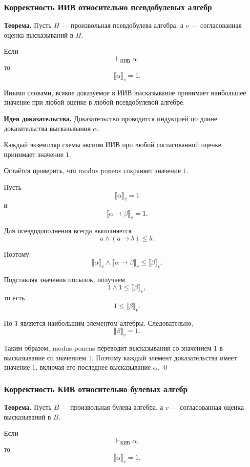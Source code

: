 \documentclass[12pt,a4paper,oneside,openany]{book}
\theoremstyle{definition}
\theoremstyle{plain}
\theoremstyle{remark}
\begin{document}
\subsubsection{Корректность ИИВ относительно псевдобулевых алгебр}

\textbf{Теорема.}
Пусть \(H\) --- произвольная псевдобулева алгебра, а \(v\) ---
согласованная оценка высказываний в \(H\).

Если
\[
\vdash_{\mathrm{ИИВ}}\alpha,
\]
то
\[
\llbracket\alpha\rrbracket_v=1.
\]

Иными словами, всякое доказуемое в ИИВ высказывание принимает
наибольшее значение при любой оценке в любой псевдобулевой алгебре.

\textbf{Идея доказательства.}
Доказательство проводится индукцией по длине доказательства
высказывания \(\alpha\).

Каждый экземпляр схемы аксиом ИИВ при любой согласованной оценке
принимает значение \(1\).

Остаётся проверить, что modus ponens сохраняет значение \(1\).

Пусть
\[
\llbracket\alpha\rrbracket_v=1
\]
и
\[
\llbracket\alpha\to\beta\rrbracket_v=1.
\]

Для псевдодополнения всегда выполняется
\[
a\wedge(a\to b)\leq b.
\]

Поэтому
\[
\llbracket\alpha\rrbracket_v
\wedge
\llbracket\alpha\to\beta\rrbracket_v
\leq
\llbracket\beta\rrbracket_v.
\]

Подставляя значения посылок, получаем
\[
1\wedge1
\leq
\llbracket\beta\rrbracket_v,
\]
то есть
\[
1\leq\llbracket\beta\rrbracket_v.
\]

Но \(1\) является наибольшим элементом алгебры. Следовательно,
\[
\llbracket\beta\rrbracket_v=1.
\]

Таким образом, modus ponens переводит высказывания со значением \(1\)
в высказывание со значением \(1\). Поэтому каждый элемент
доказательства имеет значение \(1\), включая его последнее
высказывание \(\alpha\).
\qed

\subsubsection{Корректность КИВ относительно булевых алгебр}

\textbf{Теорема.}
Пусть \(B\) --- произвольная булева алгебра, а \(v\) ---
согласованная оценка высказываний в \(B\).

Если
\[
\vdash_{\mathrm{КИВ}}\alpha,
\]
то
\[
\llbracket\alpha\rrbracket_v=1.
\]
\end{document}
